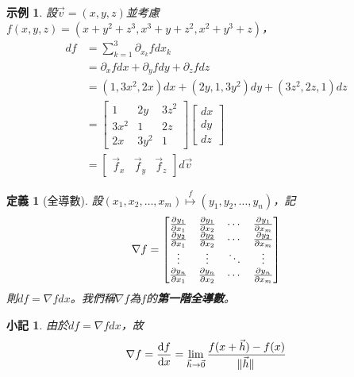 \documentclass[12pt]{article}
\newtheorem{definition}{定義}
\newtheorem*{remark}{小記}
\newtheorem*{example}{示例}
\begin{document}
    \begin{example}
        設$\vec{v}=(x,y,z)$並考慮$f(x,y,z)=(x+y^2+z^3, x^3+y+z^2, x^2+y^3+z)$，\begin{align*}
            df&=\sum_{k=1}^{3}\partial_{x_k}f dx_k\\
            &=\partial_x f dx + \partial_y f dy + \partial_z f dz\\
            &=(1,3x^2,2x) dx+ (2y,1,3y^2) dy + (3z^2,2z,1) dz\\
            &=\begin{bmatrix}
                1&2y&3z^2\\3x^2&1&2z\\2x&3y^2&1
            \end{bmatrix}\begin{bmatrix}
                dx\\dy\\dz
            \end{bmatrix}\\
            &=\begin{bmatrix}
                \vec{f}_x&\vec{f}_y&\vec{f}_z
            \end{bmatrix}d\vec{v}
        \end{align*}
    \end{example}

    \begin{definition}[全導數]
        設$(x_1,x_2,\dots,x_m)\overset{f}{\mapsto}(y_1,y_2,\dots,y_n)$，記$$\nabla f=\begin{bmatrix}
            \partialderivative{y_1}{x_1}&\partialderivative{y_1}{x_2}&\cdots&\partialderivative{y_1}{x_m}\\
            \partialderivative{y_2}{x_1}&\partialderivative{y_2}{x_2}&\cdots&\partialderivative{y_2}{x_m}\\
            \vdots&\vdots&\ddots&\vdots\\
            \partialderivative{y_n}{x_1}&\partialderivative{y_n}{x_2}&\cdots&\partialderivative{y_n}{x_m}
        \end{bmatrix}$$
        則$df=\nabla f dx$。我們稱$\nabla f$為$f$的\textbf{第一階全導數}。
    \end{definition}

    \begin{remark}
        由於$df=\nabla f dx$，故$$\nabla f = \derivative{f}{x}=\lim_{\vec{h}\to\vec{0}}\frac{f(x+\vec{h})-f(x)}{\norm*{\vec{h}}}$$
    \end{remark}
\end{document}
